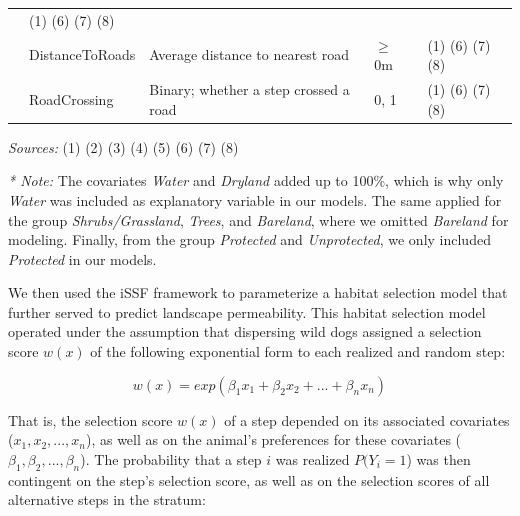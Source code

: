 \documentclass[abstract=off,10pt,a4paper,bibliography=totocnumbered]{article}
\begin{document}
\begin{table}[hbtp]
\begin{center}
{\begin{threeparttable}
\begin{tabular}{lllll}
                & (1) (6) (7) (8)\\
          & DistanceToRoads
            & Average distance to nearest road
              & \(\geq\) 0m
                & (1) (6) (7) (8)\\
          & RoadCrossing
            & Binary; whether a step crossed a road
              & 0, 1
                & (1) (6) (7) (8)\\
        \hline
        \end{tabular}
        \begin{tablenotes}
          \item \textit{Sources:} (1) \cite{Chen.2015} (2) \cite{Schaaf.2015} (3)
          \cite{Yamazaki.2019} (4) \cite{Dimiceli.2015} (5) \cite{PeaceParks.2019}
          (6) \cite{Facebook.2019} (7) \cite{OpenStreetMap.2019} (8)
          \cite{Xiong.2017}
          \item
          \item \textit{* Note:} The covariates \textit{Water} and
          \textit{Dryland} added up to 100\%, which is why only \textit{Water} was
          included as explanatory variable in our models. The same applied for the
          group \textit{Shrubs/Grassland}, \textit{Trees}, and \textit{Bareland},
          where we omitted \textit{Bareland} for modeling. Finally, from the group
          \textit{Protected} and \textit{Unprotected}, we only included
          \textit{Protected} in our models.
        \end{tablenotes}
      \end{threeparttable}
    }
  \end{center}
\end{table}

\noindent We then used the iSSF framework to parameterize a habitat selection
model that further served to predict landscape permeability. This habitat
selection model operated under the assumption that dispersing wild dogs assigned
a selection score \(w(x)\) of the following exponential form to each realized
and random step:

\begin{equation}
\label{EQ2}
  w(x) = exp(\beta_1 x_1 + \beta_2 x_2 + ... + \beta_n x_n)
\end{equation}

\noindent That is, the selection score \(w(x)\) of a step depended on its
associated covariates (\(x_1, x_2, ..., x_n\)), as well as on the animal's
preferences for these covariates (\(\beta_1, \beta_2, ..., \beta_n\)). The
probability that a step \(i\) was realized \(P(Y_{i} = 1\)) was then contingent
on the step's selection score, as well as on the selection scores of all
alternative steps in the stratum:
\end{document}
